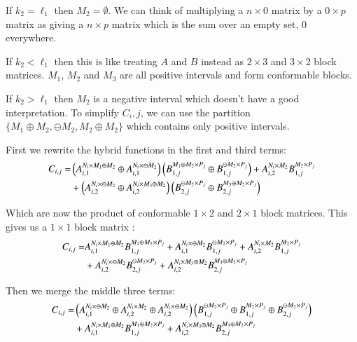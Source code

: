 If $k_2 = \ell_1$ then $M_2 = \emptyset$.
We can think of multiplying a $n \times 0$ matrix by a $0 \times p$ matrix as giving a $n \times p$ matrix which is the sum
over an empty set, 0 everywhere.

If $k_2 < \ell_1$ then this is like treating $A$ and $B$ instead as $2 \times 3$ and $3 \times 2$ block matrices.
$M_1$, $M_2$ and $M_3$ are all positive intervals and form conformable blocks.

If $k_2 > \ell_1$ then $M_2$ is a negative interval which doesn't have a good interpretation.
To simplify $C_i,j$, we can use the partition $ \{ M_1 \oplus M_2, \ominus M_2, M_2 \oplus M_2 \}$ which contains only
positive intervals.


First we rewrite the hybrid functions in the first and third terms:
\begin{align}
	C_{i,j} 	= &\left( A_{i,1}^{N_i \times M_1 \oplus M_2} \oplus A_{i,1}^{N_i \times \ominus M_2} \right)
				\left( B_{1,j}^{M_1 \oplus M_2 \times P_j} \oplus B_{1,j}^{\ominus M_2 \times P_j} \right)
			+ A_{i,2}^{N_i \times M_2} B_{1,j}^{M_2 \times P_j} \notag\\
			&+ \left( A_{i,2}^{N_i \times \ominus M_2} \oplus A_{i,2}^{N_i \times M_3 \oplus M_2} \right)
			 \left( B_{2,j}^{\ominus M_2 \times P_j} \oplus B_{2,j}^{M_3 \oplus M_2 \times P_j} \right)
\end{align}

Which are now the product of conformable $1 \times 2$ and $2 \times 1$ block matrices.
This gives us a $1 \times 1$ block matrix :
\begin{align}
	C_{i,j} 	= & A_{i,1}^{N_i \times M_1 \oplus M_2} B_{1,j}^{M_1 \oplus M_2 \times P_j}
			+ A_{i,1}^{N_i \times \ominus M_2} B_{1,j}^{\ominus M_2 \times P_j}
			+ A_{i,2}^{N_i \times M_2} B_{1,j}^{M_2 \times P_j} \notag\\
			&+ A_{i,2}^{N_i \times \ominus M_2} B_{2,j}^{\ominus M_2 \times P_j}
			+ A_{i,2}^{N_i \times M_3 \oplus M_2} B_{2,j}^{M_3 \oplus M_2 \times P_j}
\end{align}

Then we merge the middle three terms:
\begin{align}
	C_{i,j} 	=& \left( A_{i,1}^{N_i \times \ominus M_2} 
				\oplus  A_{i,2}^{N_i \times M_2} 
				\oplus A_{i,2}^{N_i \times \ominus M_2} \right)
			\left( B_{1,j}^{\ominus M_2 \times P_j} 
				\oplus B_{1,j}^{M_2 \times P_j} 
				\oplus B_{2,j}^{\ominus M_2 \times P_j} \right)\notag\\
			&+ A_{i,1}^{N_i \times M_1 \oplus M_2} B_{1,j}^{M_1 \oplus M_2 \times P_j} 
			+ A_{i,2}^{N_i \times M_3 \oplus M_2} B_{2,j}^{M_3 \oplus M_2 \times P_j} 
\end{align}


